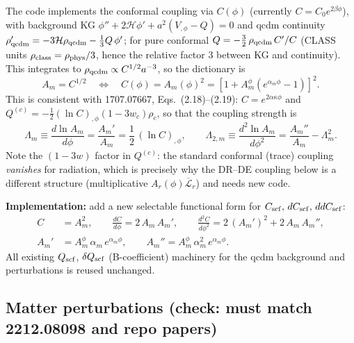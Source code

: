 \documentclass[11pt]{article}
\newcommand{\Lr}{\overline{\mathcal{L}}_{r}}
\newcommand{\Am}{A_{m}}
\newcommand{\Ar}{A_{r}}
\newcommand{\cH}{\mathcal{H}}
\begin{document}
The code implements the conformal coupling via $C(\phi)$
(currently $C=C_0e^{2\beta\phi}$), with background KG
$\phi''+2\cH\phi'+a^2(V_{,\phi}-Q)=0$ and qcdm continuity
$\rho_{\rm qcdm}'=-3\cH\rho_{\rm qcdm}-\tfrac13 Q\,\phi'$; for pure conformal
$Q=-\tfrac32\,\rho_{\rm qcdm}\,C'/C$ (CLASS units $\rho_{\rm class}=\rho_{\rm phys}/3$,
hence the relative factor 3 between KG and continuity). This integrates to
$\rho_{\rm qcdm}\propto C^{1/2}a^{-3}$, so the dictionary is
\begin{equation}
\boxed{\;\Am=C^{1/2}\quad\Longleftrightarrow\quad C(\phi)=\Am(\phi)^2
=\left[1+A^{\phi}_{m}\left(e^{\alpha_m\phi}-1\right)\right]^2 .\;}
\label{eq:mapping}
\end{equation}
This is consistent with 1707.07667, Eqs.~(2.18)--(2.19): $C=e^{2\alpha\kappa\phi}$ and
$Q^{(c)}=-\tfrac12(\ln C)_{,\phi}(1-3w_c)\rho_c$, so that the coupling strength is
\begin{equation}
\Lambda_m \equiv \frac{d\ln \Am}{d\phi} = \frac{\Am'}{\Am} = \frac12\,(\ln C)_{,\phi} ,
\qquad
\Lambda_{2,m} \equiv \frac{d^2\ln \Am}{d\phi^2} = \frac{\Am''}{\Am}-\Lambda_m^2 .
\end{equation}
Note the $(1-3w)$ factor in $Q^{(c)}$: the standard conformal (trace) coupling
\emph{vanishes} for radiation, which is precisely why the DR--DE coupling below is a
different structure (multiplicative $\Ar(\phi)\Lr$) and needs new code.

\textbf{Implementation:} add a new selectable functional form for
$C_{\rm scf},\,dC_{\rm scf},\,ddC_{\rm scf}$:
\begin{align}
C &= \Am^2, \qquad
\frac{dC}{d\phi} = 2\,\Am\,\Am', \qquad
\frac{d^2C}{d\phi^2} = 2\,(\Am')^2 + 2\,\Am\,\Am'' ,\\
\Am' &= A^{\phi}_m\,\alpha_m\,e^{\alpha_m\phi}, \qquad
\Am'' = A^{\phi}_m\,\alpha_m^2\,e^{\alpha_m\phi} .
\end{align}
All existing $Q_{\rm scf}$, $\delta Q_{\rm scf}$ (B-coefficient) machinery for the
qcdm background and perturbations is reused unchanged.

\subsection*{Matter perturbations (check: must match 2212.08098 and repo papers)}
\end{document}
